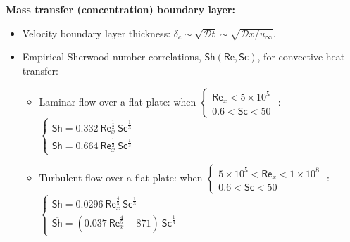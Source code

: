 \documentclass[10pt, a4paper, table]{article}
\newcommand{\Ree}{\mathsf{Re}}
\newcommand{\Sc}{\mathsf{Sc}}
\newcommand{\Sh}{\mathsf{Sh}}
\begin{document}
\begin{mdframed}
\vspace{.2cm}
\textbf{Mass transfer (concentration) boundary layer:}
\begin{itemize}
    \item Velocity boundary layer thickness: $\delta_{c} \sim \sqrt{\mathcal{D} t} \sim \sqrt{\mathcal{D} x/u_{\infty}}$.

    \item Empirical Sherwood number correlations, $\Sh(\Ree, \Sc)$, for convective heat transfer:
    \begin{itemize}
        \item Laminar flow over a flat plate: when
        $
            \begin{cases}
                \Ree_{x} < 5 \times 10^{5}\\
                0.6 < \Sc < 50
            \end{cases}
        $
        :
        $ \displaystyle
            \begin{cases}
                \Sh = 0.332 \ \Ree_{x}^{\frac{1}{2}} \ \Sc^{\frac{1}{3}} \\
                \overline{\Sh} = 0.664 \ \Ree_{x}^{\frac{1}{2}} \ \Sc^{\frac{1}{3}}
            \end{cases}
        $
    
        \item Turbulent flow over a flat plate: when
        $
            \begin{cases}
                5 \times 10^{5}< \Ree_{x} < 1 \times 10^{8} \\
                0.6 < \Sc < 50
            \end{cases}
        $
        :
        $ \displaystyle
            \begin{cases}
                \Sh = 0.0296 \ \Ree_{x}^{\frac{4}{5}} \ \Sc^{\frac{1}{3}} \\
                \overline{\Sh} = \left( 0.037 \ \Ree_{x}^{\frac{4}{5}} - 871 \right)\ \Sc^{\frac{1}{3}} 
            \end{cases}
        $
    \end{itemize}
\end{itemize}
\end{mdframed}
\end{document}
